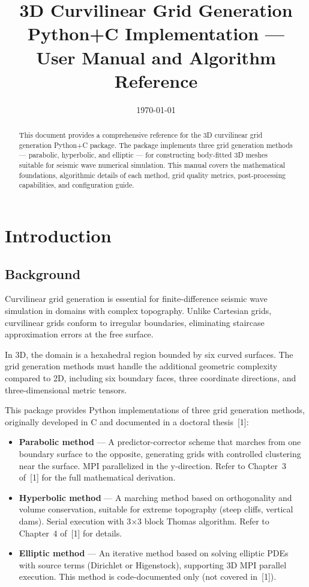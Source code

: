 \documentclass[11pt,a4paper]{report}
\title{\textbf{3D Curvilinear Grid Generation}\\[0.5em]
\large Python+C Implementation --- User Manual and Algorithm Reference}
\author{}
\date{\today}
\begin{document}
\maketitle

\begin{abstract}
This document provides a comprehensive reference for the 3D curvilinear grid generation Python+C package. The package implements three grid generation methods --- parabolic, hyperbolic, and elliptic --- for constructing body-fitted 3D meshes suitable for seismic wave numerical simulation. This manual covers the mathematical foundations, algorithmic details of each method, grid quality metrics, post-processing capabilities, and configuration guide.
\end{abstract}

\tableofcontents

\chapter{Introduction}

\section{Background}

Curvilinear grid generation is essential for finite-difference seismic wave simulation in domains with complex topography. Unlike Cartesian grids, curvilinear grids conform to irregular boundaries, eliminating staircase approximation errors at the free surface.

In 3D, the domain is a hexahedral region bounded by six curved surfaces. The grid generation methods must handle the additional geometric complexity compared to 2D, including six boundary faces, three coordinate directions, and three-dimensional metric tensors.

This package provides Python implementations of three grid generation methods, originally developed in C and documented in a doctoral thesis~[1]:

\begin{itemize}
    \item \textbf{Parabolic method} --- A predictor-corrector scheme that marches from one boundary surface to the opposite, generating grids with controlled clustering near the surface. MPI parallelized in the y-direction. Refer to Chapter~3 of~[1] for the full mathematical derivation.
    \item \textbf{Hyperbolic method} --- A marching method based on orthogonality and volume conservation, suitable for extreme topography (steep cliffs, vertical dams). Serial execution with 3$\times$3 block Thomas algorithm. Refer to Chapter~4 of~[1] for details.
    \item \textbf{Elliptic method} --- An iterative method based on solving elliptic PDEs with source terms (Dirichlet or Higenstock), supporting 3D MPI parallel execution. This method is code-documented only (not covered in~[1]).
\end{itemize}
\end{document}
